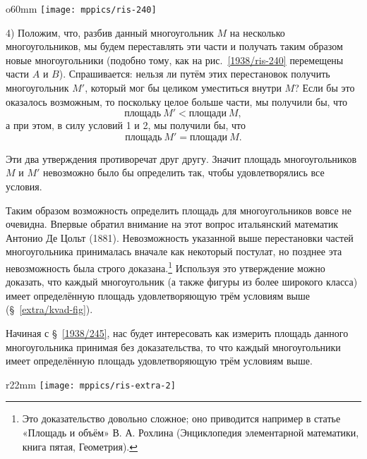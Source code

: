 \begin{wrapfigure}{o}{60mm}
\centering
\texttt{[image: mppics/ris-240]}
\caption{}\label{1938/ris-240}
\end{wrapfigure}

4) Положим, что, разбив данный многоугольник $M$ на несколько многоугольников, мы будем переставлять эти части и получать таким образом новые многоугольники (подобно тому, как на рис.~\ref{1938/ris-240} перемещены части $A$ и $B$).
Спрашивается:
нельзя ли путём этих перестановок получить многоугольник $M'$, который мог бы целиком уместиться внутри $M$?
Если бы это оказалось возможным, то поскольку целое больше части, мы получили бы, что
\[\text{площадь}~M'<\text{площади}~M,\]
а при этом, в силу условий 1 и 2, мы получили бы, что
\[\text{площадь}~M'=\text{площади}~M.\]

Эти два утверждения противоречат друг другу.
Значит площадь многоугольников $M$ и $M'$ невозможно было бы определить так, чтобы удовлетворялись все условия.

Таким образом возможность определить площадь для многоугольников вовсе не очевидна.
Впервые обратил внимание на этот вопрос итальянский математик Антонио Де Цольт (1881).
Невозможность указанной выше перестановки частей многоугольника принималась вначале как некоторый постулат, но позднее эта невозможность была строго доказана.\footnote{Это доказательство довольно сложное; оно приводится например в статье «Площадь и объём» В. А. Рохлина (Энциклопедия элементарной математики, книга пятая, Геометрия).}
Используя  это утверждение можно доказать, что каждый многоугольник (а также фигуры из более широкого класса) имеет определённую площадь удовлетворяющую трём условиям выше (§~\ref{extra/kvad-fig}).

Начиная с §~\ref{1938/245}, нас будет интересовать как измерить площадь данного многоугольника принимая без доказательства, то что каждый многоугольники имеет определённую площадь удовлетворяющую трём условиям выше.

\begin{wrapfigure}{r}{22mm}
\centering
\texttt{[image: mppics/ris-extra-2]}
\caption{}\label{extra/ris-2}
\end{wrapfigure}

